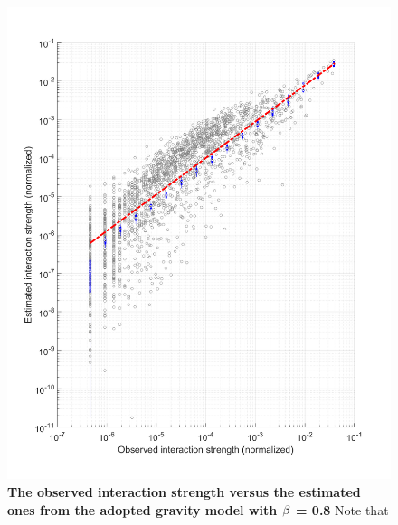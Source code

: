 \documentclass[]{tGIS2e}
\begin{document}
\begin{figure}[ht]
\begin{center}
\includegraphics[width=0.8\linewidth]{./figure/Gravity}
\caption{{\bf The observed interaction strength versus the estimated ones from the adopted gravity model with $\bf{\beta}$ = 0.8 } Note that }
\label{S8_Fig}
\end{center}
\end{figure}

\clearpage
\end{document}
